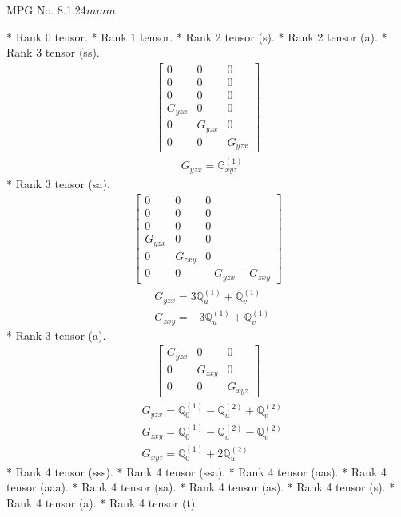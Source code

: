 \documentclass[fleqn,8pt,landscape]{jsarticle}
\begin{document}
\setcounter{MaxMatrixCols}{32}

\renewcommand{\tablename}{Table~}
\renewcommand{\figurename}{Figure~}
\begin{center}
\LARGE
MPG No. 8.1.24\quad$mmm$
\end{center}
* Rank 0 tensor.
* Rank 1 tensor.
* Rank 2 tensor (s).
* Rank 2 tensor (a).
* Rank 3 tensor (ss).
\begin{align*}
\begin{bmatrix} 0 & 0 & 0 \\ 0 & 0 & 0 \\ 0 & 0 & 0 \\ G_{yzx} & 0 & 0 \\ 0 & G_{yzx} & 0 \\ 0 & 0 & G_{yzx} \end{bmatrix}
\end{align*}
\begin{align*}
& G_{yzx} = \mathbb{G}_{xyz}^{(1)}
\end{align*}
* Rank 3 tensor (sa).
\begin{align*}
\begin{bmatrix} 0 & 0 & 0 \\ 0 & 0 & 0 \\ 0 & 0 & 0 \\ G_{yzx} & 0 & 0 \\ 0 & G_{zxy} & 0 \\ 0 & 0 & - G_{yzx} - G_{zxy} \end{bmatrix}
\end{align*}
\begin{align*}
& G_{yzx} = 3 \mathbb{Q}_{u}^{(1)} + \mathbb{Q}_{v}^{(1)} \\
& G_{zxy} = - 3 \mathbb{Q}_{u}^{(1)} + \mathbb{Q}_{v}^{(1)}
\end{align*}
* Rank 3 tensor (a).
\begin{align*}
\begin{bmatrix} G_{yzx} & 0 & 0 \\ 0 & G_{zxy} & 0 \\ 0 & 0 & G_{xyz} \end{bmatrix}
\end{align*}
\begin{align*}
& G_{yzx} = \mathbb{Q}_{0}^{(1)} - \mathbb{Q}_{u}^{(2)} + \mathbb{Q}_{v}^{(2)} \\
& G_{zxy} = \mathbb{Q}_{0}^{(1)} - \mathbb{Q}_{u}^{(2)} - \mathbb{Q}_{v}^{(2)} \\
& G_{xyz} = \mathbb{Q}_{0}^{(1)} + 2 \mathbb{Q}_{u}^{(2)}
\end{align*}
* Rank 4 tensor (sss).
* Rank 4 tensor (ssa).
* Rank 4 tensor (aas).
* Rank 4 tensor (aaa).
* Rank 4 tensor (sa).
* Rank 4 tensor (as).
* Rank 4 tensor (s).
* Rank 4 tensor (a).
* Rank 4 tensor (t).
\end{document}

